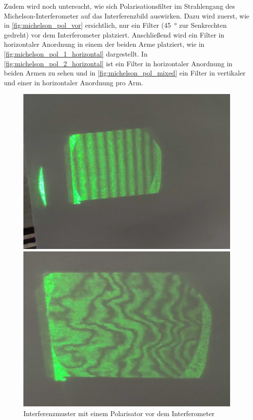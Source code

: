 \documentclass[ngerman]{scrartcl}
\begin{document}
Zudem wird noch untersucht, wie sich Polarisationsfilter im Strahlengang des Michelson-Interferometer auf das Interferenzbild auswirken.
Dazu wird zuerst, wie in \autoref{fig:michelson_pol_vor} ersichtlich, nur ein Filter (\SI{45}{\degree} zur Senkrechten gedreht) vor dem Interferometer platziert. Anschließend wird ein Filter in horizontaler Anordnung in einem der beiden Arme platziert, wie in \autoref{fig:michelson_pol_1_horizontal} dargestellt. In \autoref{fig:michelson_pol_2_horizontal} ist ein Filter in horizontaler Anordnung in beiden Armen zu sehen und in \autoref{fig:michelson_pol_mixed} ein Filter in vertikaler und einer in horizontaler Anordnung pro Arm.
%
\setcapindent{0pt}
\begin{figure}[H]
    \centering
    \begin{minipage}[t]{0.45\linewidth}
        \centering
        \includegraphics[width=\linewidth]{fig/Compressed/Out_horizontal_detail.jpg} %
        \caption[Interferenzmuster Polarisator davor]{Interferenzmuster mit einem Polarisator vor dem Interferometer}
        \label{fig:michelson_pol_vor}
        \includegraphics[width=\linewidth]{fig/Compressed/Arago_2_Horizontal_detail.jpg}

\end{minipage}
\end{figure}
\end{document}
